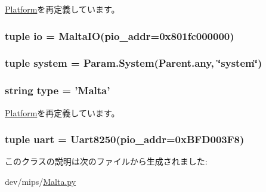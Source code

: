 \hyperlink{classPlatform_1_1Platform_a17da7064bc5c518791f0c891eff05fda}{Platform}を再定義しています。\hypertarget{classMalta_1_1Malta_a2c4f3d37bf2004da1c3daf41d84880f4}{
\subsubsection[{io}]{\setlength{\rightskip}{0pt plus 5cm}tuple {\bf io} = {\bf MaltaIO}(pio\_\-addr=0x801fc000000)}}
\label{classMalta_1_1Malta_a2c4f3d37bf2004da1c3daf41d84880f4}
\hypertarget{classMalta_1_1Malta_ab737471139f5a296e5b26e8a0e1b0744}{
\subsubsection[{system}]{\setlength{\rightskip}{0pt plus 5cm}tuple {\bf system} = Param.System(Parent.any, \char`\"{}system\char`\"{})}}
\label{classMalta_1_1Malta_ab737471139f5a296e5b26e8a0e1b0744}
\hypertarget{classMalta_1_1Malta_acce15679d830831b0bbe8ebc2a60b2ca}{
\subsubsection[{type}]{\setlength{\rightskip}{0pt plus 5cm}string {\bf type} = '{\bf Malta}'}}
\label{classMalta_1_1Malta_acce15679d830831b0bbe8ebc2a60b2ca}


\hyperlink{classPlatform_1_1Platform_acce15679d830831b0bbe8ebc2a60b2ca}{Platform}を再定義しています。\hypertarget{classMalta_1_1Malta_a1f69fbabd17d6bca63f97f9754247cfd}{
\subsubsection[{uart}]{\setlength{\rightskip}{0pt plus 5cm}tuple {\bf uart} = {\bf Uart8250}(pio\_\-addr=0xBFD003F8)}}
\label{classMalta_1_1Malta_a1f69fbabd17d6bca63f97f9754247cfd}


このクラスの説明は次のファイルから生成されました:\begin{DoxyCompactItemize}
\item 
dev/mips/\hyperlink{Malta_8py}{Malta.py}\end{DoxyCompactItemize}
